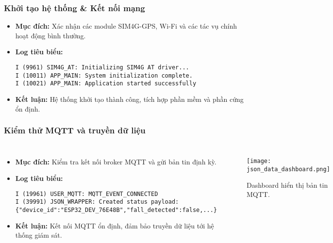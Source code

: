 \begin{frame}[t,fragile]
\frametitle{Khởi tạo hệ thống \& Kết nối mạng}
\begin{itemize}
    \item \textbf{Mục đích:} Xác nhận các module SIM4G-GPS, Wi-Fi và các tác vụ chính hoạt động bình thường.
    \item \textbf{Log tiêu biểu:}
    \begin{verbatim}
I (9961) SIM4G_AT: Initializing SIM4G AT driver...
I (10011) APP_MAIN: System initialization complete.
I (10021) APP_MAIN: Application started successfully
    \end{verbatim}
    \item \textbf{Kết luận:} Hệ thống khởi tạo thành công, tích hợp phần mềm và phần cứng ổn định.
\end{itemize}
\end{frame}

\begin{frame}[t,fragile]
\frametitle{Kiểm thử MQTT và truyền dữ liệu}
\begin{columns}[T]
    \begin{itemize}
        \item \textbf{Mục đích:} Kiểm tra kết nối broker MQTT và gửi bản tin định kỳ.
        \item \textbf{Log tiêu biểu:}
        \begin{verbatim}
I (19961) USER_MQTT: MQTT_EVENT_CONNECTED
I (39991) JSON_WRAPPER: Created status payload:
{"device_id":"ESP32_DEV_76E48B","fall_detected":false,...}
        \end{verbatim}
        \item \textbf{Kết luận:} Kết nối MQTT ổn định, đảm bảo truyền dữ liệu tới hệ thống giám sát.
    \end{itemize}
    \begin{figure}
        \centering
        \texttt{[image: json\_data\_dashboard.png]}
        \caption{Dashboard hiển thị bản tin MQTT.}
    \end{figure}
\end{columns}
\end{frame}

